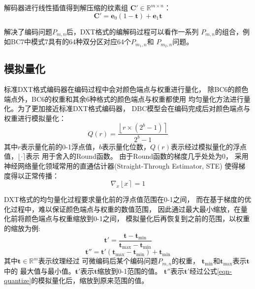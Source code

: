 解码器进行线性插值得到解压缩的纹素组 $\mathbf{C}'\in\mathbb{R}^{m\times n}$：
\begin{equation}
\mathbf{C}'=\mathbf{e}_0(1-\mathbf{t})+\mathbf{e}_1\mathbf{t}
\end{equation}

解决了编码问题$P_{m,n}$后，DXT格式的编解码过程可以看作一系列
$P_{m,n}$的组合，例如BC7中模式7具有的64种双分区对应64个$P_{m_1,n}$和
$P_{m_2,n}$问题。

\subsection{模拟量化}
\label{模拟量化}

标准DXT格式编码器在编码过程中会对颜色端点与权重进行量化，
除BC6的颜色端点外，BC6的权重和其余6种格式的颜色端点与权重都使用
均匀量化方法进行量化。为了更加接近标准DXT格式编码器，
DBC模型会在编码完成后对颜色端点与权重进行模拟量化：
\begin{equation}\label{eqn-quantize}
    Q(r)=\frac{\left \lfloor r \times (2^{b}-1) \right \rceil}{2^{b}-1}
\end{equation}
其中$r$表示量化前的0-1浮点值，$b$表示量化位数，$Q(r)$表示经过模拟量化的浮点值，$\lfloor \cdot \rceil$表示
用于舍入的Round函数。
由于Round函数的梯度几乎处处为0，
采用神经网络量化领域常用的直通估计器\cite{bengio2013estimating}(Straight-Through Estimator, STE)
使得梯度得以正常传播：
\begin{equation}\label{eqn-7}
    \nabla_{x} \left \lfloor x \right \rceil=1
\end{equation}

DXT格式的均匀量化过程要求量化前的浮点值范围在0-1之间，
而在基于梯度的优化过程中，难以保证颜色端点与权重的数值范围，
因此通过最大最小缩放，在量化前将颜色端点与权重缩放到0-1之间，
模拟量化后再恢复到之前的范围，以权重的缩放为例:
\begin{equation}
    \mathbf{t'}=\frac{\mathbf{t}-\mathbf{t}_\text{min}}{\mathbf{t}_\text{max}-\mathbf{t}_\text{min}}
\end{equation}
\begin{equation}
    \mathbf{t''}=\mathbf{t'}(\mathbf{t}_\text{max}-\mathbf{t}_\text{min})+\mathbf{t}_\text{min}
\end{equation}
其中$\mathbf{t}\in\mathbb{R}^m$表示纹理经过
可微编码后某个编码问题$P_{m,n}$的权重，
$\mathbf{t}_\text{min}$和$\mathbf{t}_\text{max}$表示$\mathbf{t}$中的
最大值与最小值。$\mathbf{t'}$表示$\mathbf{t}$缩放到0-1范围的值。
$\mathbf{t''}$表示$\mathbf{t'}$经过公式\ref{eqn-quantize}的模拟量化后，缩放到原来范围的值。


